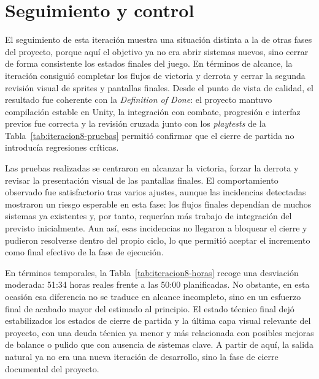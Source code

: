 \section{Seguimiento y control}
El seguimiento de esta iteración muestra una situación distinta a la de otras fases del
proyecto, porque aquí el objetivo ya no era abrir sistemas nuevos, sino cerrar de forma
consistente los estados finales del juego. En términos de alcance, la iteración consiguió
completar los flujos de victoria y derrota y cerrar la segunda revisión visual de sprites y
pantallas finales. Desde el punto de vista de calidad, el resultado fue
coherente con la \textit{Definition of Done}: el proyecto mantuvo compilación estable en
Unity, la integración con combate, progresión e interfaz previos fue correcta y la revisión
cruzada junto con los \textit{playtests} de la Tabla~\ref{tab:iteracion8-pruebas} permitió
confirmar que el cierre de partida no introducía regresiones críticas.

Las pruebas realizadas se centraron en alcanzar la victoria, forzar la derrota y revisar la
presentación visual de las pantallas finales. El comportamiento observado fue satisfactorio
tras varios ajustes, aunque las incidencias detectadas mostraron un riesgo esperable en esta
fase: los flujos finales dependían de muchos sistemas ya existentes y, por tanto, requerían
más trabajo de integración del previsto inicialmente. Aun así, esas incidencias no llegaron a
bloquear el cierre y pudieron resolverse dentro del propio ciclo, lo que permitió aceptar el
incremento como final efectivo de la fase de ejecución.

En términos temporales, la Tabla~\ref{tab:iteracion8-horas} recoge una desviación moderada:
51:34 horas reales frente a las 50:00 planificadas. No obstante, en esta ocasión esa
diferencia no se traduce en alcance incompleto, sino en un esfuerzo final de acabado mayor del
estimado al principio. El estado técnico final dejó estabilizados los estados de cierre de
partida y la última capa visual relevante del proyecto, con una deuda técnica ya menor y más
relacionada con posibles mejoras de balance o pulido que con ausencia de sistemas clave. A
partir de aquí, la salida natural ya no era una nueva iteración de desarrollo, sino la fase
de cierre documental del proyecto.

